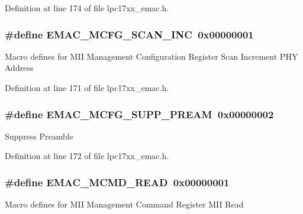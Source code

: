 \-Definition at line 174 of file lpc17xx\-\_\-emac.\-h.

\hypertarget{group___e_m_a_c___private___macros_ga7e7a6dd010ea69d1ccd69bd821669291}{
\subsubsection[{\-E\-M\-A\-C\-\_\-\-M\-C\-F\-G\-\_\-\-S\-C\-A\-N\-\_\-\-I\-N\-C}]{\setlength{\rightskip}{0pt plus 5cm}\#define {\bf \-E\-M\-A\-C\-\_\-\-M\-C\-F\-G\-\_\-\-S\-C\-A\-N\-\_\-\-I\-N\-C}~0x00000001}}\label{group___e_m_a_c___private___macros_ga7e7a6dd010ea69d1ccd69bd821669291}
\-Macro defines for \-M\-I\-I \-Management \-Configuration \-Register \-Scan \-Increment \-P\-H\-Y \-Address 

\-Definition at line 171 of file lpc17xx\-\_\-emac.\-h.

\hypertarget{group___e_m_a_c___private___macros_gaee41a7636ce7048d57ad112c44a2fc90}{
\subsubsection[{\-E\-M\-A\-C\-\_\-\-M\-C\-F\-G\-\_\-\-S\-U\-P\-P\-\_\-\-P\-R\-E\-A\-M}]{\setlength{\rightskip}{0pt plus 5cm}\#define {\bf \-E\-M\-A\-C\-\_\-\-M\-C\-F\-G\-\_\-\-S\-U\-P\-P\-\_\-\-P\-R\-E\-A\-M}~0x00000002}}\label{group___e_m_a_c___private___macros_gaee41a7636ce7048d57ad112c44a2fc90}
\-Suppress \-Preamble 

\-Definition at line 172 of file lpc17xx\-\_\-emac.\-h.

\hypertarget{group___e_m_a_c___private___macros_ga4488dce71c84fa1bc9a1829e7e065ced}{
\subsubsection[{\-E\-M\-A\-C\-\_\-\-M\-C\-M\-D\-\_\-\-R\-E\-A\-D}]{\setlength{\rightskip}{0pt plus 5cm}\#define {\bf \-E\-M\-A\-C\-\_\-\-M\-C\-M\-D\-\_\-\-R\-E\-A\-D}~0x00000001}}\label{group___e_m_a_c___private___macros_ga4488dce71c84fa1bc9a1829e7e065ced}
\-Macro defines for \-M\-I\-I \-Management \-Command \-Register \-M\-I\-I \-Read 

